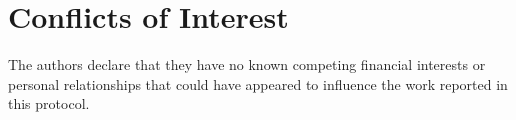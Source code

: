 \section*{Conflicts of Interest}\label{sec:competing-interests}

The authors declare that they have no known competing financial interests or personal relationships that could have appeared to influence the work reported in this protocol.

